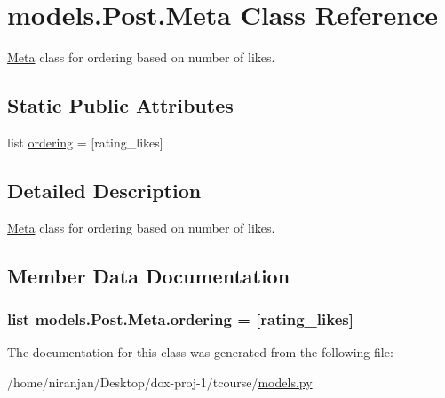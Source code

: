 \hypertarget{classmodels_1_1_post_1_1_meta}{}\section{models.\+Post.\+Meta Class Reference}
\label{classmodels_1_1_post_1_1_meta}


\hyperlink{classmodels_1_1_post_1_1_meta}{Meta} class for ordering based on number of likes.  


\subsection*{Static Public Attributes}
\begin{DoxyCompactItemize}
\item 
list \hyperlink{classmodels_1_1_post_1_1_meta_a88bd52ac83bde8628472a4f27c1ac174}{ordering} = \mbox{[}\textquotesingle{}rating\+\_\+likes\textquotesingle{}\mbox{]}
\end{DoxyCompactItemize}


\subsection{Detailed Description}
\hyperlink{classmodels_1_1_post_1_1_meta}{Meta} class for ordering based on number of likes. 

\subsection{Member Data Documentation}
\subsubsection[{\texorpdfstring{ordering}{ordering}}]{\setlength{\rightskip}{0pt plus 5cm}list models.\+Post.\+Meta.\+ordering = \mbox{[}\textquotesingle{}rating\+\_\+likes\textquotesingle{}\mbox{]}\hspace{0.3cm}{\ttfamily [static]}}\hypertarget{classmodels_1_1_post_1_1_meta_a88bd52ac83bde8628472a4f27c1ac174}{}\label{classmodels_1_1_post_1_1_meta_a88bd52ac83bde8628472a4f27c1ac174}


The documentation for this class was generated from the following file\+:\begin{DoxyCompactItemize}
\item 
/home/niranjan/\+Desktop/dox-\/proj-\/1/tcourse/\hyperlink{models_8py}{models.\+py}\end{DoxyCompactItemize}

